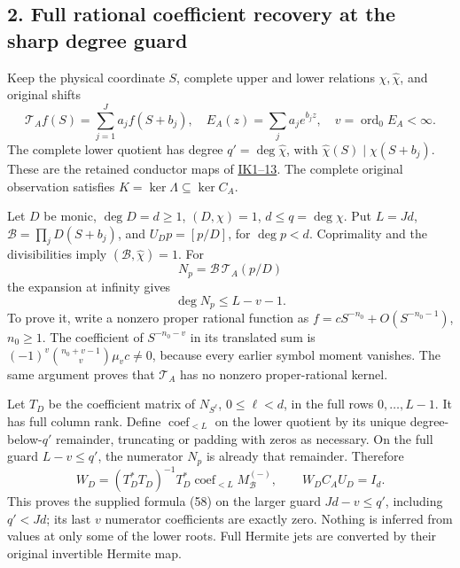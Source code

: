 \subsection{2. Full rational coefficient recovery at the sharp degree guard}\label{full-rational-coefficient-recovery-at-the-sharp-degree-guard}

Keep the physical coordinate \(S\), complete upper and lower relations \(\chi,\widehat\chi\), and original shifts \[
\mathcal T_A f(S)=\sum_{j=1}^J a_j f(S+b_j),\quad
E_A(z)=\sum_j a_j e^{b_jz},\quad v=\operatorname{ord}_0E_A<\infty.
\] The complete lower quotient has degree \(q'=\deg\widehat\chi\), with \(\widehat\chi(S)\mid\chi(S+b_j)\). These are the retained conductor maps of \href{https://github.com/KokunoYumeto/zeta-function-research-reader/blob/689a8f87e9c12b7a99b01b3123438c6751ee608f/workbenches/splitzero-tandem/continuations/20260921-directional-inverse-power/007/INVERSE_POWER_CONDUCTOR_OBSERVABILITY.tex}{IK1--13}. The complete original observation satisfies \(K=\ker\Lambda\subseteq\ker C_A\).

Let \(D\) be monic, \(\deg D=d\ge1\), \((D,\chi)=1\), \(d\le q=\deg\chi\). Put \(L=Jd\), \(\mathcal B=\prod_jD(S+b_j)\), and \(U_Dp=[p/D]\), for \(\deg p<d\). Coprimality and the divisibilities imply \((\mathcal B,\widehat\chi)=1\). For \[
N_p=\mathcal B\,\mathcal T_A(p/D)
\] the expansion at infinity gives \[
\deg N_p\le L-v-1.                                               \tag{UFR9}
\] To prove it, write a nonzero proper rational function as \(f=cS^{-n_0}+O(S^{-n_0-1})\), \(n_0\ge1\). The coefficient of \(S^{-n_0-v}\) in its translated sum is \((-1)^v\binom{n_0+v-1}{v}\mu_vc\ne0\), because every earlier symbol moment vanishes. The same argument proves that \(\mathcal T_A\) has no nonzero proper-rational kernel.

Let \(T_D\) be the coefficient matrix of \(N_{S^\ell}\), \(0\le\ell<d\), in the full rows \(0,\ldots,L-1\). It has full column rank. Define \(\operatorname{coef}_{<L}\) on the lower quotient by its unique degree-below-\(q'\) remainder, truncating or padding with zeros as necessary. On the full guard \(L-v\le q'\), the numerator \(N_p\) is already that remainder. Therefore \[
W_D=(T_D^*T_D)^{-1}T_D^*
       \operatorname{coef}_{<L}M_{\mathcal B}^{(-)},\qquad
\boxed{W_DC_AU_D=I_d}.                                          \tag{UFR10}
\] This proves the supplied formula (58) on the larger guard \(Jd-v\le q'\), including \(q'<Jd\); its last \(v\) numerator coefficients are exactly zero. Nothing is inferred from values at only some of the lower roots. Full Hermite jets are converted by their original invertible Hermite map.

